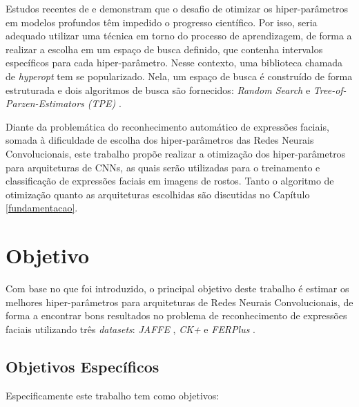 \documentclass[
12pt,       %
openright,      %
oneside,      %
a4paper,      %
english,      %
french,       %
spanish,      %
brazil        %
]{abntex2}
\begin{document}
Estudos recentes de \cite{pinto2009high} e \cite{coates2011importance} demonstram que o desafio de otimizar os hiper-parâmetros em modelos profundos têm impedido o progresso científico. Por isso, seria adequado utilizar uma técnica em torno do processo de aprendizagem, de forma a realizar a escolha em um espaço de busca definido, que contenha intervalos específicos para cada hiper-parâmetro. Nesse contexto, uma biblioteca chamada de \textit{hyperopt} \cite{bergstra2013hyperopt} tem se popularizado. Nela, um espaço de busca é construído de forma estruturada e dois algoritmos de busca são fornecidos: \textit{Random Search} e \textit{Tree-of-Parzen-Estimators (TPE)} \cite{bergstra2011algorithms}.

Diante da problemática do reconhecimento automático de expressões faciais, somada à dificuldade de escolha dos hiper-parâmetros das Redes Neurais Convolucionais, este trabalho propõe realizar a otimização dos hiper-parâmetros para arquiteturas de CNNs, as quais serão utilizadas para o treinamento e classificação de expressões faciais em imagens de rostos. Tanto o algoritmo de otimização quanto as arquiteturas escolhidas são discutidas no Capítulo \ref{fundamentacao}.

\section{Objetivo} \label{objetivo}

Com base no que foi introduzido, o principal objetivo deste trabalho é estimar os melhores hiper-parâmetros para arquiteturas de Redes Neurais Convolucionais, de forma a encontrar bons resultados no problema de reconhecimento de expressões faciais utilizando três \textit{datasets}: \textit{JAFFE} \cite{lyons1998coding}, \textit{CK+} \cite{lucey2010extended} e \textit{FERPlus} \cite{Barsoum2016}.

\subsection{Objetivos Específicos} \label{objetivosespecificos}

Especificamente este trabalho tem como objetivos:
\end{document}
